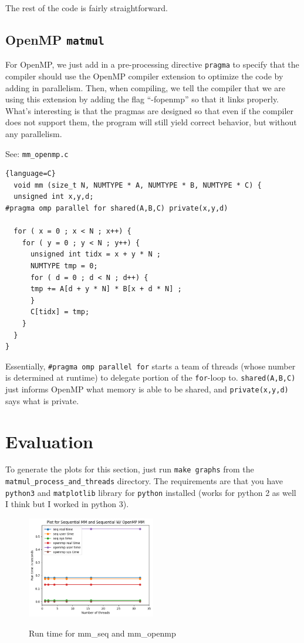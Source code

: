 \documentclass{article}
\begin{document}
The rest of the code is fairly straightforward.
\subsection{OpenMP \texttt{matmul}}
For OpenMP, we just add in a pre-processing directive \texttt{pragma} to specify that the compiler should use the OpenMP compiler extension to optimize the code by adding in parallelism. Then, when compiling, we tell the compiler that we are using this extension by adding the flag ``-fopenmp'' so that it links properly.  What's interesting is that the pragmas are designed so that even if the compiler does not support them, the program will still yield correct behavior, but without any parallelism.

See: \texttt{mm\_openmp.c}
\begin{lstlisting}{language=C}
  void mm (size_t N, NUMTYPE * A, NUMTYPE * B, NUMTYPE * C) {
  unsigned int x,y,d;
#pragma omp parallel for shared(A,B,C) private(x,y,d)

  for ( x = 0 ; x < N ; x++) {
    for ( y = 0 ; y < N ; y++) {
      unsigned int tidx = x + y * N ;
      NUMTYPE tmp = 0;
      for ( d = 0 ; d < N ; d++) {
	  tmp += A[d + y * N] * B[x + d * N] ;
      }
      C[tidx] = tmp;
    }
  }
}
\end{lstlisting}

Essentially, \texttt{\#pragma omp parallel for} starts a team of threads (whose number is determined at runtime) to delegate portion of the \texttt{for}-loop to. \texttt{shared(A,B,C)} just informs OpenMP what memory is able to be shared, and \texttt{private(x,y,d)} says what is private.

\section{Evaluation}
To generate the plots for this section, just run \texttt{make graphs} from the \texttt{matmul\_process\_and\_threads} directory. The requirements are that you have \texttt{python3} and \texttt{matplotlib} library for \texttt{python} installed (works for python 2 as well I think but I worked in python 3).

\begin{figure}[!h]
\centering  \includegraphics[width=0.5\textwidth]{others}
\label{fig: mm_seq and mm_openmp}
\caption{Run time for mm\_seq and mm\_openmp}
\end{figure}
\end{document}
